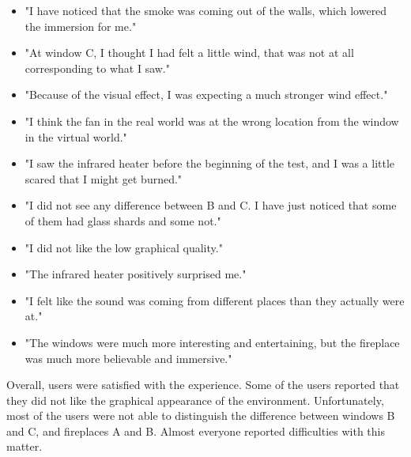 \begin{itemize}

\item "I have noticed that the smoke was coming out of the walls, which
lowered the immersion for me."

\item "At window C, I thought I had felt a little wind,
that was not at all corresponding to what I saw."

\item "Because of the visual effect, I was expecting a much stronger wind
effect."

\item "I think the fan in the real world was at the wrong location from the
window in the virtual world."

\item "I saw the infrared heater before the beginning of the test, and I was
a little scared that I might get burned."

\item "I did not see any difference between B and C. I have just noticed that
some of them had glass shards and some not."

\item "I did not like the low graphical quality."

\item "The infrared heater positively surprised me."

\item "I felt like the sound was coming from different places than they actually
were at."

\item "The windows were much more interesting and entertaining, but the fireplace
was much more believable and immersive."

\end{itemize}


Overall, users were satisfied with the experience. Some of the users reported
that they did not like the graphical appearance of the environment.
Unfortunately, most of the users were not able to distinguish the difference
between windows B and C, and fireplaces A and B. Almost everyone reported
difficulties with this matter.